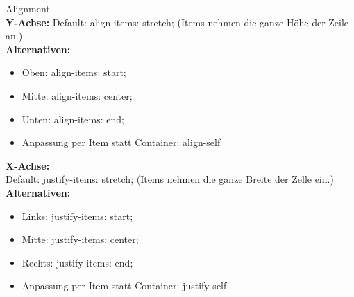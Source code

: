 \textcolor{subsectioncolor}{Alignment}\\
\textbf{Y-Achse:} Default: align-items: stretch; (Items nehmen die ganze Höhe der Zeile an.)\\
\textbf{Alternativen:}
\begin{itemize}
    \item Oben: align-items: start;
    \item Mitte: align-items: center;
    \item Unten: align-items: end;
    \item Anpassung per Item statt Container: align-self
\end{itemize}
\textbf{X-Achse:}\\
Default: justify-items: stretch; (Items nehmen die ganze Breite der Zelle ein.) \\
\textbf{Alternativen:}
\begin{itemize}
    \item Links: justify-items: start;
    \item Mitte: justify-items: center;
    \item Rechts: justify-items: end;
    \item Anpassung per Item statt Container: justify-self
\end{itemize}

\columnbreak